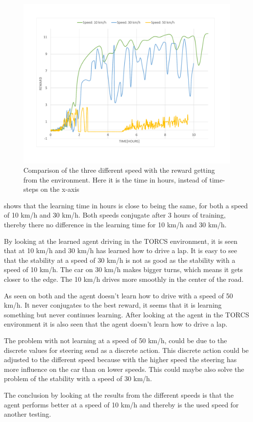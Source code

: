 \begin{figure}[H]
	\centering
	\includegraphics[width=1\textwidth]{Figures/Result/change_of_acceleration_reward_hours_graph.pdf}
	\caption{Comparison of the three different speed with the reward getting from the environment. Here it is the time in hours, instead of time-steps on the x-axis}
	\label{fig:change_of_acceleration_reward_hours_graph}
\end{figure}

 shows that the learning time in hours is close to being the same, for both a speed of 10 km/h and 30 km/h. Both speeds conjugate after 3 hours of training, thereby there no difference in the learning time for 10 km/h and 30 km/h.

By looking at the learned agent driving in the TORCS environment, it is seen that at 10 km/h and 30 km/h has learned how to drive a lap. It is easy to see that the stability at a speed of 30 km/h is not as good as the stability with a speed of 10 km/h. The car on 30 km/h makes bigger turns, which means it gets closer to the edge. The 10 km/h drives more smoothly in the center of the road.

As seen on both  and  the agent doesn't learn how to drive with a speed of 50 km/h. It never conjugates to the best reward, it seems that it is learning something but never continues learning. After looking at the agent in the TORCS environment it is also seen that the agent doesn’t learn how to drive a lap.

The problem with not learning at a speed of 50 km/h, could be due to the discrete values for steering send as a discrete action. This discrete action could be adjusted to the different speed because with the higher speed the steering has more influence on the car than on lower speeds. This could maybe also solve the problem of the stability with a speed of 30 km/h. 

The conclusion by looking at the results from the different speeds is that the agent performs better at a speed of 10 km/h and thereby is the used speed for another testing.

    